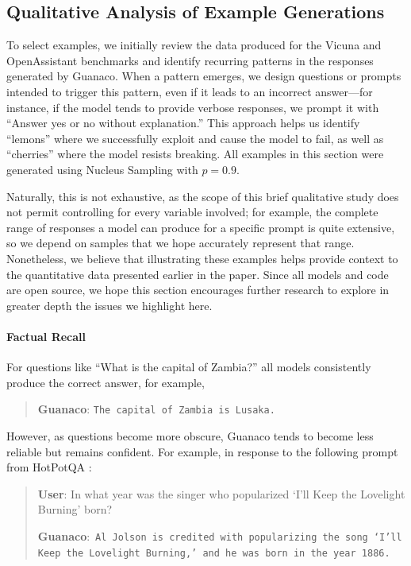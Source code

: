 \subsection{Qualitative Analysis of Example Generations}
\label{ssec:examples}

To select examples, we initially review the data produced for the Vicuna and OpenAssistant benchmarks and identify recurring patterns in the responses generated by {Guanaco}. When a pattern emerges, we design questions or prompts intended to trigger this pattern, even if it leads to an incorrect answer—for instance, if the model tends to provide verbose responses, we prompt it with ``Answer yes or no without explanation.'' This approach helps us identify ``lemons'' where we successfully exploit and cause the model to fail, as well as ``cherries'' where the model resists breaking. All examples in this section were generated using Nucleus Sampling \cite{holtzmancurious} with $p=0.9$.

Naturally, this is not exhaustive, as the scope of this brief qualitative study does not permit controlling for every variable involved; for example, the complete range of responses a model can produce for a specific prompt is quite extensive, so we depend on samples that we hope accurately represent that range. Nonetheless, we believe that illustrating these examples helps provide context to the quantitative data presented earlier in the paper. Since all models and code are open source, we hope this section encourages further research to explore in greater depth the issues we highlight here.
\paragraph{Factual Recall} For questions like ``What is the capital of Zambia?'' all models consistently produce the correct answer, for example,

\begin{quote} 
    \textbf{Guanaco}:
    \texttt{The capital of Zambia is Lusaka.}
\end{quote}

However, as questions become more obscure, {Guanaco} tends to become less reliable but remains confident. For example, in response to the following prompt from HotPotQA \citep{yang2018hotpotqa}:

\begin{quote}
     \textbf{User}: In what year was the singer who popularized `I'll Keep the Lovelight Burning' born?  

     \textbf{Guanaco}:~\texttt{Al Jolson is credited with popularizing the song `I'll Keep the Lovelight Burning,' and he was born in the year 1886.}
 \end{quote}


